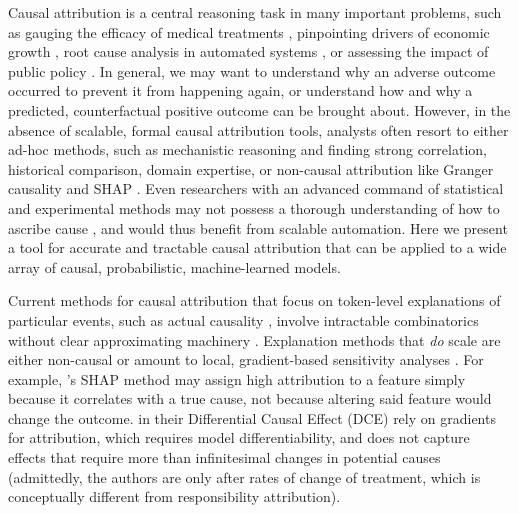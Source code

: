 \documentclass[anon,12pt]{clear2026} %
\begin{document}
Causal attribution is a central reasoning task in many important problems, such as gauging the efficacy of medical treatments \citep{Shepherd2024}, pinpointing drivers of economic growth \citep{CheshireMagrini2009}, root cause analysis in automated systems \citep{Papageorgiou2022}, or assessing the impact of public policy \citep{HeckmanPinto2022CausalPolicyAnalysis}. In general, we may want to understand why an adverse outcome occurred to prevent it from happening again, or understand how and why a predicted, counterfactual positive outcome can be brought about. However, in the absence of scalable, formal causal attribution tools, analysts often resort to either ad-hoc methods, such as mechanistic reasoning and finding strong correlation, historical comparison, domain expertise, or non-causal attribution like Granger causality \citep{Granger1969} and SHAP \citep{lundberg2017unified}. Even researchers with an advanced command of statistical and experimental methods may not possess a thorough understanding of how to ascribe cause \citep{Shepherd2024}, and would thus benefit from scalable automation. Here we present a tool for accurate and tractable causal attribution that can be applied to a wide array of causal, probabilistic, machine-learned models.

Current methods for causal attribution that focus on token-level explanations of particular events, such as actual causality \citep{actualCausalityHalpern}, involve intractable combinatorics without clear approximating machinery \citep{eiterComplexityResultsStructurebased2002}. Explanation methods that \textit{do} scale are either non-causal \citep{lundberg2017unified} or amount to local, gradient-based sensitivity analyses \citep{butler2022differential}. For example, \citeauthor{lundberg2017unified}'s SHAP method may assign high attribution to a feature simply because it correlates with a true cause, not because altering said feature would change the outcome. \citeauthor{butler2022differential} in their Differential Causal Effect (DCE) rely on gradients for attribution, which requires model differentiability, and does not capture effects that require more than infinitesimal changes in potential causes (admittedly,  the authors are only after rates of change of treatment, which is conceptually different from responsibility attribution).
\end{document}
